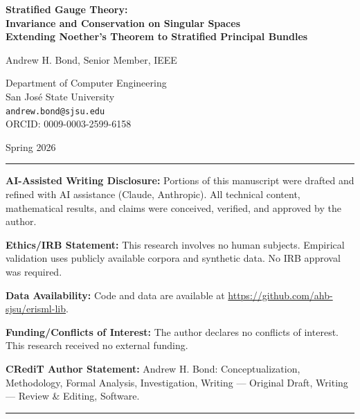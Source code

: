 \documentclass[12pt,letterpaper]{article}
\begin{document}
\begin{titlepage}
\centering
\vspace*{2cm}

{\LARGE\bfseries Stratified Gauge Theory:\\Invariance and Conservation on Singular Spaces\\
 Extending Noether's Theorem to Stratified Principal Bundles\par}

\vspace{2cm}

{\large Andrew H. Bond, Senior Member, IEEE\par}
\vspace{0.5cm}
{\normalsize Department of Computer Engineering\\
San Jos\'{e} State University\\
\texttt{andrew.bond@sjsu.edu}\\
ORCID: 0009-0003-2599-6158\par}

\vspace{1cm}

{\normalsize Spring 2026\par}

\vfill

\noindent\rule{\textwidth}{0.4pt}
\small

\noindent\textbf{AI-Assisted Writing Disclosure:} Portions of this manuscript were drafted and refined with AI assistance (Claude, Anthropic). All technical content, mathematical results, and claims were conceived, verified, and approved by the author.

\vspace{0.5em}
\noindent\textbf{Ethics/IRB Statement:} This research involves no human subjects. Empirical validation uses publicly available corpora and synthetic data. No IRB approval was required.

\vspace{0.5em}
\noindent\textbf{Data Availability:} Code and data are available at \url{https://github.com/ahb-sjsu/erisml-lib}.

\vspace{0.5em}
\noindent\textbf{Funding/Conflicts of Interest:} The author declares no conflicts of interest. This research received no external funding.

\vspace{0.5em}
\noindent\textbf{CRediT Author Statement:} Andrew H. Bond: Conceptualization, Methodology, Formal Analysis, Investigation, Writing --- Original Draft, Writing --- Review \& Editing, Software.

\normalsize
\noindent\rule{\textwidth}{0.4pt}

\end{titlepage}
\end{document}
